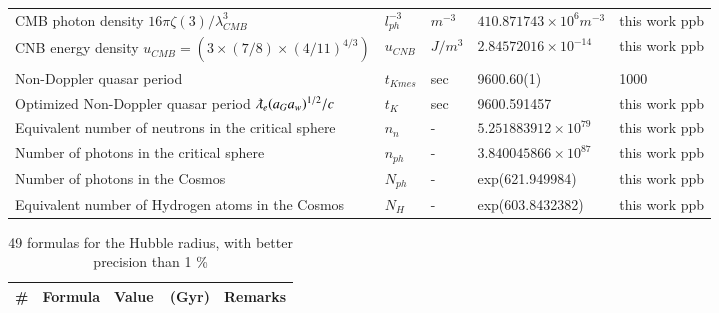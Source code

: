 \documentclass[a4paper,9pt]{article}
\begin{document}
\begin{appendix}
\begin{table}
\begin{tabular}{lllll}
 CMB photon density $16 \pi \zeta (3)/\lambda_{CMB}^3$  & $l_{ph}^{-3}$  & $m^{-3}$   & $410.871743 \times 10^6 m^{-3}$ & this work ppb\\
 
  CNB energy density $u_{CMB} = (3\times (7/8) \times (4/11)^{4/3})$ & $u_{CNB}$ & $J/m^3$ & $2.84572016\times 10^{-14}$ & this work ppb\\
  
  Non-Doppler quasar period & $t_{Kmes}$ & sec & 9600.60(1) & 1000 \\
  
 Optimized Non-Doppler quasar period $\lambdabar_e (a_Ga_w)^{1/2}/c$ & $t_{K}$ & sec & 9600.591457 & this work ppb \\
 
 Equivalent number of neutrons in the critical sphere & $n_n$ & - & $5.251883912 \times 10^{79}$ & this work ppb \\
 
 Number of photons in the critical sphere  & $n_{ph}$ & - & $3.840045866 \times 10^{87}$ & this work ppb \\
 
 Number of photons in the Cosmos  & $N_{ph}$ & - & exp(621.949984) & this work ppb \\
 
 Equivalent number of Hydrogen atoms in the Cosmos  & $N_H$ & - & exp(603.8432382) & this work ppb \\
 \bottomrule
  \end{tabular}
\end{table}
 

\begin{table}
\caption{49 formulas for the Hubble radius, with better precision than 1 \%}
\label{tab:4:table4}
  \hskip-2.0cm\begin{tabular}{llll}
    \toprule
    \cmidrule(r){1-4}
   \#     & Formula     & Value~~(Gyr) & Remarks \\
    \midrule
    

\end{tabular}
\end{table}
\end{appendix}
\end{document}
